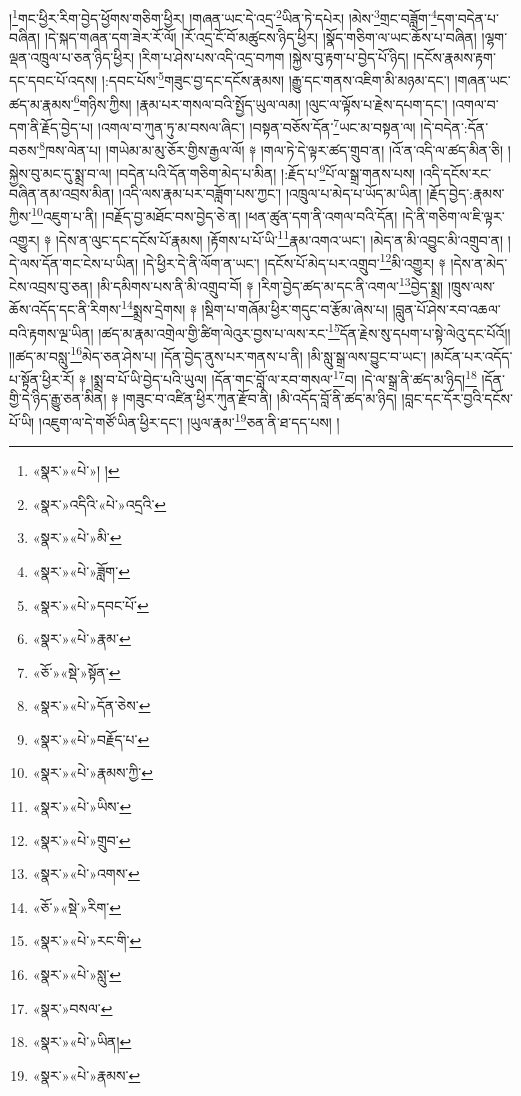  །\footnote{«སྣར་»«པེ་»། །}གང་ཕྱིར་རིག་བྱེད་ཕྱོགས་གཅིག་ཕྱིར། །གཞན་ཡང་དེ་འདྲ་\footnote{«སྣར་»འདིའི་«པེ་»འདྲའི་}ཡིན་ཏེ་དཔེར། །མེས་\footnote{«སྣར་»«པེ་»མི་}གྲང་བཟློག་\footnote{«སྣར་»«པེ་»ཟློག་}དག་བདེན་པ་བཞིན། །དེ་སྐད་གཞན་དག་ཟེར་རོ་ལོ། །རོ་འདྲ་ངོ་བོ་མཚུངས་ཉིད་ཕྱིར། །སྣོད་གཅིག་ལ་ཡང་ཆོས་པ་བཞིན། །ལྷག་ལྡན་འཁྲུལ་པ་ཅན་ཉིད་ཕྱིར། །རིག་པ་ཤེས་པས་འདི་འདྲ་བཀག །སྐྱེས་བུ་རྟག་པ་བྱེད་པོ་ཉིད། །དངོས་རྣམས་རྟག་དང་དབང་པོ་འདས། །:དབང་པོས་\footnote{«སྣར་»«པེ་»དབང་པོ་}གཟུང་བྱ་དང་དངོས་རྣམས། །རྒྱུ་དང་གནས་འཇིག་མི་མཉམ་དང་། །གཞན་ཡང་ཚད་མ་རྣམས་\footnote{«སྣར་»«པེ་»རྣམ་}གཉིས་ཀྱིས། །རྣམ་པར་གསལ་བའི་སྤྱོད་ཡུལ་ལམ། །ལུང་ལ་ལྟོས་པ་རྗེས་དཔག་དང་། །འགལ་བ་དག་ནི་རྗོད་བྱེད་པ། །འགལ་བ་ཀུན་ཏུ་མ་བསལ་ཞིང་། །བསྟན་བཅོས་དོན་\footnote{«ཅོ་»«སྡེ་»སྟོན་}ཡང་མ་བསྟན་ལ། །དེ་བདེན་:དོན་བཅས་\footnote{«སྣར་»«པེ་»དོན་ཅེས་}ཁས་ལེན་པ། །གཡེམ་མ་མུ་ཅོར་གྱིས་རྒྱལ་ལོ། ༈ །གལ་ཏེ་དེ་ལྟར་ཚད་གྲུབ་ན། །འོ་ན་འདི་ལ་ཚད་མིན་ཅི། །སྐྱེས་བུ་མང་དུ་སྨྲ་བ་ལ། །བདེན་པའི་དོན་གཅིག་མེད་པ་མིན། །:རྗོད་པ་\footnote{«སྣར་»«པེ་»བརྗོད་པ་}པོ་ལ་སྒྲ་གནས་པས། །འདི་དངོས་རང་བཞིན་ནམ་འབྲས་མིན། །འདི་ལས་རྣམ་པར་བཟློག་པས་ཀྱང་། །འཁྲུལ་པ་མེད་པ་ཡོད་མ་ཡིན། །རྗོད་བྱེད་:རྣམས་ཀྱིས་\footnote{«སྣར་»«པེ་»རྣམས་ཀྱི་}འཇུག་པ་ནི། །བརྗོད་བྱ་མཐོང་བས་བྱེད་ཅེ་ན། །ཕན་ཚུན་དག་ནི་འགལ་བའི་དོན། །དེ་ནི་གཅིག་ལ་ཇི་ལྟར་འགྱུར། ༈ །དེས་ན་ལུང་དང་དངོས་པོ་རྣམས། །རྟོགས་པ་པོ་ཡི་\footnote{«སྣར་»«པེ་»ཡིས་}རྣམ་འགའ་ཡང་། །མེད་ན་མི་འབྱུང་མི་འགྲུབ་ན། །དེ་ལས་དོན་གང་ངེས་པ་ཡིན། །དེ་ཕྱིར་དེ་ནི་ལོག་ན་ཡང་། །དངོས་པོ་མེད་པར་འགྲུབ་\footnote{«སྣར་»«པེ་»གྲུབ་}མི་འགྱུར། ༈ །དེས་ན་མེད་ངེས་འབྲས་བུ་ཅན། །མི་དམིགས་པས་ནི་མི་འགྲུབ་བོ། ༈ །རིག་བྱེད་ཚད་མ་དང་ནི་འགལ་\footnote{«སྣར་»«པེ་»འགས་}བྱེད་སྨྲ། །ཁྲུས་ལས་ཆོས་འདོད་དང་ནི་རིགས་\footnote{«ཅོ་»«སྡེ་»རིག་}སྨྲས་དྲེགས། ༈ །སྡིག་པ་གཞོམ་ཕྱིར་གདུང་བ་རྩོམ་ཞེས་པ། །བླུན་པོ་ཤེས་རབ་འཆལ་བའི་རྟགས་ལྔ་ཡིན། །ཚད་མ་རྣམ་འགྲེལ་གྱི་ཚིག་ལེའུར་བྱས་པ་ལས་རང་\footnote{«སྣར་»«པེ་»རང་གི་}དོན་རྗེས་སུ་དཔག་པ་སྟེ་ལེའུ་དང་པོའོ།། །།ཚད་མ་བསླུ་\footnote{«སྣར་»«པེ་»སླུ་}མེད་ཅན་ཤེས་པ། །དོན་བྱེད་ནུས་པར་གནས་པ་ནི། །མི་སླུ་སྒྲ་ལས་བྱུང་བ་ཡང་། །མངོན་པར་འདོད་པ་སྟོན་ཕྱིར་རོ། ༈ །སྨྲ་བ་པོ་ཡི་བྱེད་པའི་ཡུལ། །དོན་གང་བློ་ལ་རབ་གསལ་\footnote{«སྣར་»བསལ་}བ། །དེ་ལ་སྒྲ་ནི་ཚད་མ་ཉིད།\footnote{«སྣར་»«པེ་»ཡིན།} །དོན་གྱི་དེ་ཉིད་རྒྱུ་ཅན་མིན། ༈ །གཟུང་བ་འཛིན་ཕྱིར་ཀུན་རྫོབ་ནི། །མི་འདོད་བློ་ནི་ཚད་མ་ཉིད། །བླང་དང་དོར་བྱའི་དངོས་པོ་ཡི། །འཇུག་ལ་དེ་གཙོ་ཡིན་ཕྱིར་དང་། །ཡུལ་རྣམ་\footnote{«སྣར་»«པེ་»རྣམས་}ཅན་ནི་ཐ་དད་པས། །
